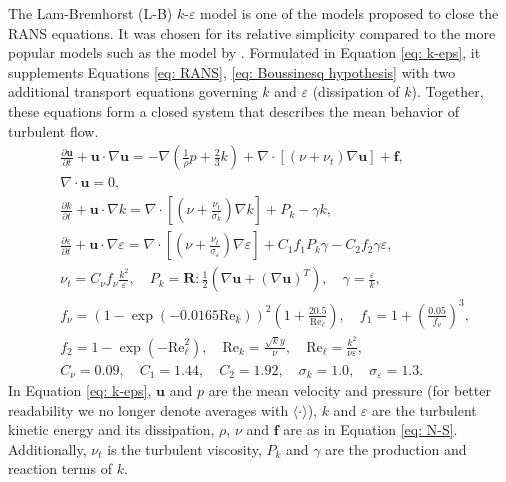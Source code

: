 The Lam-Bremhorst (L-B) \(k\)-\(\varepsilon\) model \citep{lam_modified_1981} is one of the models proposed to close the RANS equations. It was chosen for its relative simplicity compared to the more popular models such as the model by \cite{launder_application_1974}. Formulated in Equation \eqref{eq: k-eps}, it supplements Equations \eqref{eq: RANS}, \eqref{eq: Boussinesq hypothesis} with two additional transport equations governing \(k\) and \(\varepsilon\) (dissipation of \(k\)). Together, these equations form a closed system that describes the mean behavior of turbulent flow.
\begin{equation}\label{eq: k-eps}
    \begin{split}
        &\frac{\partial \mathbf{u}}{\partial t} 
        + \mathbf{u} \cdot \nabla{\mathbf{u}}
        = 
        - \nabla{\left( \frac{1}{\rho}p + \frac{2}{3}k \right)}
        + \nabla \cdot \left[ (\nu + \nu_t) \nabla \mathbf{u} \right]
        + \mathbf{f},
        \\
        &\nabla \cdot \mathbf{u}
        = 0,
        \\
        &\frac{\partial k}{\partial t} 
        + \mathbf{u} \cdot \nabla{k}
        = \nabla \cdot \left[\left(\nu + \frac{\nu_t}{\sigma_k}\right) \nabla{k} \right]
        + P_k
        - \gamma k,
        \\
        &\frac{\partial \varepsilon}{\partial t} 
        + \mathbf{u} \cdot \nabla{\varepsilon}
        = \nabla \cdot \left[\left(\nu + \frac{\nu_t}{\sigma_\varepsilon}\right) \nabla{\varepsilon}\right]
        + C_1 f_1 P_k \gamma
        - C_2 f_2 \gamma \varepsilon,
        \\
        &\nu_t
        = C_\nu f_\nu \frac{k^2}{\varepsilon},
        \quad 
        P_k 
        = \mathbf{R} : \frac{1}{2} \left(\nabla{\mathbf{u}} + (\nabla{\mathbf{u}})^T\right),
        \quad
        \gamma
        = \frac{\varepsilon}{k},
        \\
        &f_\nu
        = (1 - \exp{\left( -0.0165 \text{Re}_k \right)})^2 \left(1 + \frac{20.5}{\text{Re}_\ell}\right),
        \quad
        f_1
        = 1 + \left( \frac{0.05}{f_\nu}\right)^3,
        \\
        &f_2 
        = 1 - \exp{\left(-\text{Re}_\ell^2\right)},
        \quad
        \text{Re}_k 
        = \frac{\sqrt{k} y}{\nu}, 
        \quad
        \text{Re}_\ell
        = \frac{k^2}{\nu \varepsilon},
        \\
        &C_\nu = 0.09, \quad
        C_1 = 1.44, \quad
        C_2 = 1.92, \quad
        \sigma_k = 1.0, \quad
        \sigma_\varepsilon = 1.3.
    \end{split}
\end{equation}
In Equation \eqref{eq: k-eps}, \(\mathbf{u}\) and \(p\) are the mean velocity and pressure (for better readability we no longer denote averages with \(\langle \cdot \rangle\)), \(k\) and \(\varepsilon\) are the turbulent kinetic energy and its dissipation, \(\rho\), \(\nu\) and \(\mathbf{f}\) are as in Equation \eqref{eq: N-S}. Additionally, \(\nu_t\) is the turbulent viscosity, \(P_k\) and \(\gamma\) are the production and reaction terms of \(k\). 

